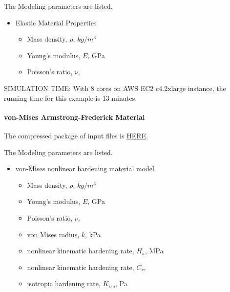 The Modeling parameters are listed.
\begin{itemize}
  \item Elastic Material Properties 
  \begin{itemize}
    \item Mass density, $\rho$, \enspace {} $kg/m^3$
    \item Young's modulus, $E$, \enspace {} GPa
    \item Poisson's ratio, $\nu$, \enspace {}
  \end{itemize}
\end{itemize}

SIMULATION TIME: With 8 cores on AWS EC2 c4.2xlarge instance, the running time for this example is 13 minutes.

\paragraph{von-Mises Armstrong-Frederick Material}
The compressed package of input files is  
\href{https://github.com/yuan-energy/Real-ESSI-Short-Course-Examples/tree/master/short-course-examples/nonlinear_analysis_steps/soil-foundation/vonMisesArmstrongFrederick/vonMisesArmstrongFrederick.tgz?raw=true}{HERE}. 


The Modeling parameters are listed.
\begin{itemize}
  \item von-Mises nonlinear hardening material model 
  \begin{itemize}
    \item Mass density, $\rho$, \enspace {} $kg/m^3$
    \item Young's modulus, $E$, \enspace {} GPa
    \item Poisson's ratio, $\nu$, \enspace {}
    \item von Mises radius, $k$, \enspace {} kPa
    \item nonlinear kinematic hardening rate, $H_a$, \enspace {} MPa
    \item nonlinear kinematic hardening rate, $C_r$, \enspace {}
    \item isotropic hardening rate, $K_{iso}$, \enspace {} Pa
  \end{itemize}
\end{itemize}


